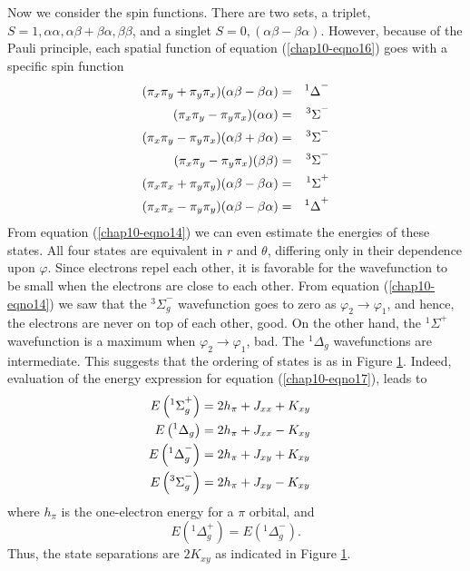 \begin{figure}
\caption{}
\label{chap10-fig3}
\end{figure}


Now we consider the spin functions. There are two sets, a triplet, $S
= 1 , \alpha \alpha , \alpha \beta + \beta \alpha , \beta \beta$, and
a singlet $S = 0 , ( \alpha \beta - \beta \alpha )$.  However, because
of the Pauli principle, each spatial function of equation
(\ref{chap10-eqno16}) goes with a specific spin function
\begin{eqnarray}
( \pi_x \pi_y + \pi_y \pi_x ) ( \alpha \beta - \beta \alpha )  &=& 
{^1\Delta}^-\cr
( \pi_x \pi_y - \pi_y \pi_x )( \alpha \alpha )&=& {^3\Sigma}^-\cr
( \pi_x \pi_y - \pi_y \pi_x )( \alpha \beta + \beta \alpha )
&=& {^3\Sigma}^-\cr
( \pi_x \pi_y - \pi_y \pi_x )( \beta \beta ) &=& {^3\Sigma}^-\cr
(\pi_x \pi_x + \pi_y \pi_y ) ( \alpha \beta - \beta \alpha ) &=& 
{^1\Sigma}^+\cr
(\pi_x \pi_x - \pi_y \pi_y ) ( \alpha \beta - \beta \alpha ) &=& 
{^1\Delta}^+
\label{chap10-eqno17}
\end{eqnarray}
From equation (\ref{chap10-eqno14}) we can even estimate the energies
of these states.  All four states are equivalent in $r$ and $\theta$,
differing only in their dependence upon $\varphi$.  Since electrons
repel each other, it is favorable for the wavefunction to be small
when the electrons are close to each other.  From equation
(\ref{chap10-eqno14}) we saw that the ${^3\Sigma}^-_g$ wavefunction
goes to zero as $\varphi_2
\rightarrow
\varphi_1$, and hence, the electrons are never
on top of each other, good. On the other hand, the ${^1\Sigma}^+$
wavefunction is a maximum when $\varphi_2 \rightarrow \varphi_1$, bad.
The ${^1\Delta}_g$ wavefunctions are intermediate.  This suggests that
the ordering of states is as in Figure \ref{chap10-fig3}.  Indeed,
evaluation of the energy expression for equation
(\ref{chap10-eqno17}), leads to
\begin{eqnarray}
E \left( {^1\Sigma}^+_g \right) &= 2 h_{\pi} + J_{xx} + K_{xy}\cr
E \left( {^1\Delta}_g \right) &= 2h_{\pi} + J_{xx} - K_{xy}\cr
E \left( {^1\Delta}^-_g \right) &= 2 h_{\pi} + J_{xy} + K_{xy}\cr
E \left( {^3\Sigma}^-_g \right) &= 2 h_{\pi} + J_{xy} - K_{xy}
\end{eqnarray}
where $h_{\pi}$ is the one-electron energy for a $\pi$ orbital, and
\begin{equation}
E \left( {^1\Delta}^+_g \right) = E \left( {^1\Delta}^-_g \right) .
\end{equation}
Thus, the state separations are $2K_{xy}$ as indicated in Figure
\ref{chap10-fig3}.

